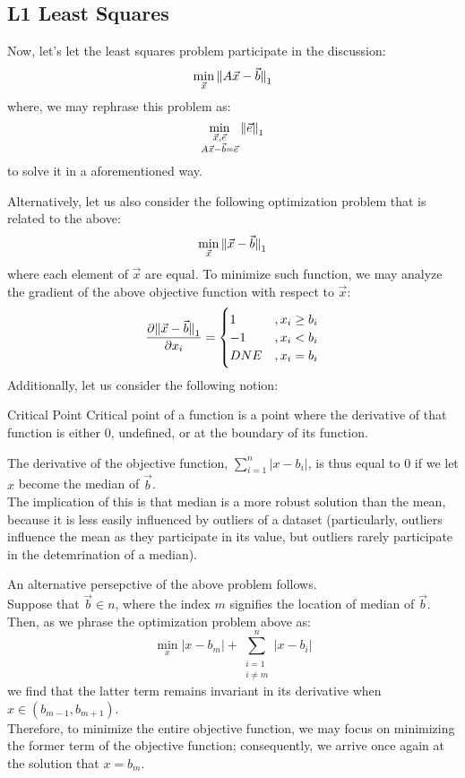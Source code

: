 \subsection{L1 Least Squares}
Now, let's let the least squares problem participate in the discussion:
\[
    \min_{\vec{x}} {\| A \vec{x} - \vec{b} \|}_{1}^{}
\]
where, we may rephrase this problem as:
\[
    \min_{
        \substack{
            \vec{x}, \vec{e} \\
            A\vec{x} - \vec{b} = \vec{e}
        }
    } {\| \vec{e} \|}_{1}^{}
\]
to solve it in a aforementioned way.

Alternatively, let us also consider the following optimization problem that is related to the above:
\[
    \min_{\vec{x}} {\| \vec{x} - \vec{b} \|}_{1}^{}
\]
where each element of $\vec{x}$ are equal.
To minimize such function, we may analyze the gradient of the above objective function with respect to $\vec{x}$:
\[
    \pdv{{\| \vec{x} - \vec{b} \|}_{1}^{}}{x_i} =
    \begin{cases}
        1 &, x_i \geq b_i \\
        -1 &, x_i < b_i \\
        DNE &, x_i = b_i
    \end{cases}
\]
Additionally, let us consider the following notion:
\begin{ln-define}{Critical Point}{}
    Critical point of a function is a point where the derivative of that function is either $0$, undefined, or at the boundary of its function.
\end{ln-define}
The derivative of the objective function, $\sum_{i = 1}^n |x - b_i|$, is thus equal to $0$ if we let $x$ become the median of $\vec{b}$. \\
The implication of this is that median is a more robust solution than the mean, because it is less easily influenced by outliers of a dataset (particularly, outliers influence the mean as they participate in its value, but outliers rarely participate in the detemrination of a median).

An alternative persepctive of the above problem follows. \\
Suppose that $\vec{b} \in n$, where the index $m$ signifies the location of median of $\vec{b}$.
Then, as we phrase the optimization problem above as:
\[
    \min_{x} |x - b_m| + \sum_{\substack{i = 1 \\ i \neq m}}^n |x - b_i|
\]
we find that the latter term remains invariant in its derivative when $x \in (b_{m - 1}, b_{m + 1})$. \\
Therefore, to minimize the entire objective function, we may focus on minimizing the former term of the objective function; consequently, we arrive once again at the solution that $x = b_m$.

